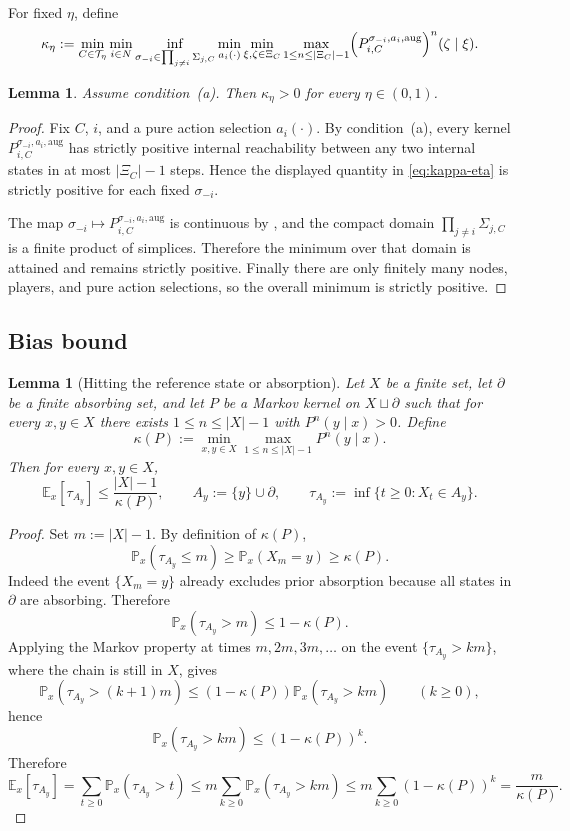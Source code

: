 \documentclass[12pt]{article}
\newtheorem{lemma}[theorem]{Lemma}
\theoremstyle{definition}
\newcommand{\E}{\mathbb{E}}
\newcommand{\Pb}{\mathbb{P}}
\newcommand{\1}{\mathbf{1}}
\newcommand{\cT}{\mathcal{T}}
\begin{document}
For fixed $\eta$, define
\begin{equation}
\label{eq:kappa-eta}
\kappa_\eta
:=
\min_{C\in\cT_\eta}
\min_{i\in N}
\inf_{\sigma_{-i}\in\prod_{j\ne i}\Sigma_{j,C}}
\min_{a_i(\cdot)}
\min_{\xi,\zeta\in\Xi_C}
\max_{1\le n\le |\Xi_C|-1}
\Bigl(P_{i,C}^{\sigma_{-i},a_i,\mathrm{aug}}\Bigr)^n(\zeta\mid\xi).
\end{equation}

\begin{lemma}
\label{lem:kappa-positive}
Assume condition~\textnormal{(a)}. Then $\kappa_\eta>0$ for every $\eta\in(0,1)$.
\end{lemma}

\begin{proof}
Fix $C$, $i$, and a pure action selection $a_i(\cdot)$. By
condition~\textnormal{(a)}, every kernel
$P_{i,C}^{\sigma_{-i},a_i,\mathrm{aug}}$ has strictly positive internal
reachability between any two internal states in at most $|\Xi_C|-1$ steps. Hence
the displayed quantity in \eqref{eq:kappa-eta} is strictly positive for each fixed
$\sigma_{-i}$.

The map
$\sigma_{-i}\mapsto P_{i,C}^{\sigma_{-i},a_i,\mathrm{aug}}$ is continuous by
, and the compact domain
$\prod_{j\ne i}\Sigma_{j,C}$ is a finite product of simplices. Therefore the
minimum over that domain is attained and remains strictly positive. Finally there
are only finitely many nodes, players, and pure action selections, so the overall
minimum is strictly positive.
\end{proof}

\subsection{Bias bound}

\begin{lemma}[Hitting the reference state or absorption]
\label{lem:hitting-time}
Let $X$ be a finite set, let $\partial$ be a finite absorbing set, and let $P$ be a
Markov kernel on $X\sqcup\partial$ such that for every $x,y\in X$ there exists
$1\le n\le |X|-1$ with $P^n(y\mid x)>0$. Define
\[
\kappa(P):=\min_{x,y\in X}\max_{1\le n\le |X|-1}P^n(y\mid x).
\]
Then for every $x,y\in X$,
\[
\E_x[\tau_{A_y}]\le \frac{|X|-1}{\kappa(P)},
\qquad
A_y:=\{y\}\cup \partial,
\qquad
\tau_{A_y}:=\inf\{t\ge 0:X_t\in A_y\}.
\]
\end{lemma}

\begin{proof}
Set $m:=|X|-1$. By definition of $\kappa(P)$,
\[
\Pb_x(\tau_{A_y}\le m)\ge \Pb_x(X_m=y)\ge \kappa(P).
\]
Indeed the event $\{X_m=y\}$ already excludes prior absorption because all states in
$\partial$ are absorbing. Therefore
\[
\Pb_x(\tau_{A_y}>m)\le 1-\kappa(P).
\]
Applying the Markov property at times $m,2m,3m,\dots$ on the event
$\{\tau_{A_y}>km\}$, where the chain is still in $X$, gives
\[
\Pb_x(\tau_{A_y}>(k+1)m)\le (1-\kappa(P))\Pb_x(\tau_{A_y}>km)
\qquad (k\ge 0),
\]
hence
\[
\Pb_x(\tau_{A_y}>km)\le (1-\kappa(P))^k.
\]
Therefore
\[
\E_x[\tau_{A_y}]
=
\sum_{t\ge 0}\Pb_x(\tau_{A_y}>t)
\le
m\sum_{k\ge 0}\Pb_x(\tau_{A_y}>km)
\le
m\sum_{k\ge 0}(1-\kappa(P))^k
=
\frac{m}{\kappa(P)}.
\]
\end{proof}
\end{document}
